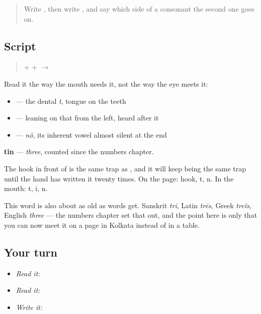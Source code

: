 \label{lesson:BN-W02-tin-read}



\begin{quote}
Write \textbf{}, then write \textbf{}, and say which side of a consonant the second one goes on.
\end{quote}

\subsection*{Script}
\begin{quote}
\textbf{} + \textbf{} + \textbf{} $\to$ \textbf{}
\end{quote}

Read it the way the mouth needs it, not the way the eye meets it:

\begin{itemize}
\raggedright
  \item \textbf{} — the dental \emph{t}, tongue on the teeth
  \item \textbf{} — leaning on that \textbf{} from the left, heard after it
  \item \textbf{} — \emph{nô}, its inherent vowel almost silent at the end
\end{itemize}

\textbf{tin} — \emph{three}, counted since the numbers chapter.

The hook in front of \textbf{} is the same trap as \textbf{}, and it will keep being the same trap until the hand has written it twenty times. On the page: hook, t, n. In the mouth: t, i, n.

This word is also about as old as words get. Sanskrit \emph{tri}, Latin \emph{trēs}, Greek \emph{treîs}, English \emph{three} — the numbers chapter set that out, and the point here is only that you can now meet it on a page in Kolkata instead of in a table.

\subsection*{Your turn}
\begin{itemize}
\raggedright
  \item \emph{Read it:} 
  \item \emph{Read it:} 
  \item \emph{Write it:} 
\end{itemize}

